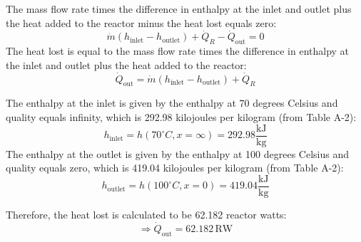 The mass flow rate times the difference in enthalpy at the inlet and outlet plus the heat added to the reactor minus the heat lost equals zero:
\[ \dot{m} (h_{\text{inlet}} - h_{\text{outlet}}) + \dot{Q}_R - \dot{Q}_{\text{out}} = 0 \]
The heat lost is equal to the mass flow rate times the difference in enthalpy at the inlet and outlet plus the heat added to the reactor:
\[ \dot{Q}_{\text{out}} = \dot{m} (h_{\text{inlet}} - h_{\text{outlet}}) + \dot{Q}_R \]

The enthalpy at the inlet is given by the enthalpy at 70 degrees Celsius and quality equals infinity, which is 292.98 kilojoules per kilogram (from Table A-2):
\[ h_{\text{inlet}} = h(70^\circ C, x = \infty) = 292.98 \frac{\text{kJ}}{\text{kg}} \]
The enthalpy at the outlet is given by the enthalpy at 100 degrees Celsius and quality equals zero, which is 419.04 kilojoules per kilogram (from Table A-2):
\[ h_{\text{outlet}} = h(100^\circ C, x = 0) = 419.04 \frac{\text{kJ}}{\text{kg}} \]

Therefore, the heat lost is calculated to be 62.182 reactor watts:
\[ \Rightarrow \dot{Q}_{\text{out}} = 62.182 \, \text{RW} \]